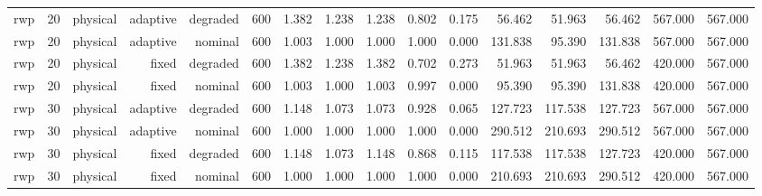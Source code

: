 \begin{tabular}{lrrrrrrrrrrrrrrr}
rwp & 20 & physical & adaptive & degraded & 600 & 1.382 & 1.238 & 1.238 & 0.802 & 0.175 & 56.462 & 51.963 & 56.462 & 567.000 & 567.000 \\
rwp & 20 & physical & adaptive & nominal & 600 & 1.003 & 1.000 & 1.000 & 1.000 & 0.000 & 131.838 & 95.390 & 131.838 & 567.000 & 567.000 \\
rwp & 20 & physical & fixed & degraded & 600 & 1.382 & 1.238 & 1.382 & 0.702 & 0.273 & 51.963 & 51.963 & 56.462 & 420.000 & 567.000 \\
rwp & 20 & physical & fixed & nominal & 600 & 1.003 & 1.000 & 1.003 & 0.997 & 0.000 & 95.390 & 95.390 & 131.838 & 420.000 & 567.000 \\
rwp & 30 & physical & adaptive & degraded & 600 & 1.148 & 1.073 & 1.073 & 0.928 & 0.065 & 127.723 & 117.538 & 127.723 & 567.000 & 567.000 \\
rwp & 30 & physical & adaptive & nominal & 600 & 1.000 & 1.000 & 1.000 & 1.000 & 0.000 & 290.512 & 210.693 & 290.512 & 567.000 & 567.000 \\
rwp & 30 & physical & fixed & degraded & 600 & 1.148 & 1.073 & 1.148 & 0.868 & 0.115 & 117.538 & 117.538 & 127.723 & 420.000 & 567.000 \\
rwp & 30 & physical & fixed & nominal & 600 & 1.000 & 1.000 & 1.000 & 1.000 & 0.000 & 210.693 & 210.693 & 290.512 & 420.000 & 567.000 \\
\bottomrule
\end{tabular}